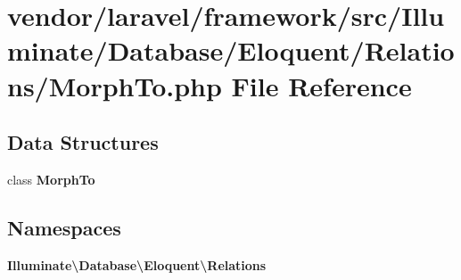 \section{vendor/laravel/framework/src/\+Illuminate/\+Database/\+Eloquent/\+Relations/\+Morph\+To.php File Reference}
\label{_morph_to_8php}
\subsection*{Data Structures}
\begin{DoxyCompactItemize}
\item 
class {\bf Morph\+To}
\end{DoxyCompactItemize}
\subsection*{Namespaces}
\begin{DoxyCompactItemize}
\item 
 {\bf Illuminate\textbackslash{}\+Database\textbackslash{}\+Eloquent\textbackslash{}\+Relations}
\end{DoxyCompactItemize}
